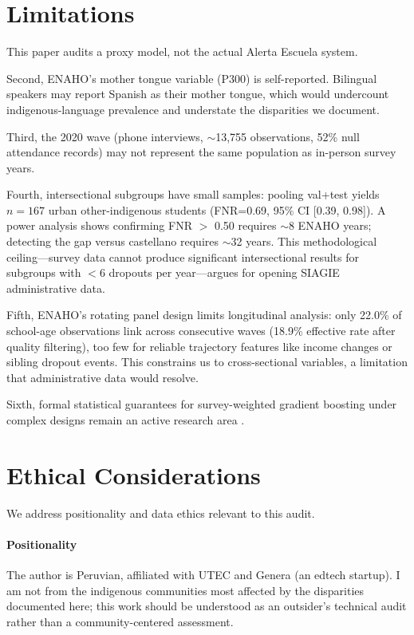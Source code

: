 \documentclass[notitlepage,12pt]{jedm}
\begin{document}
\section{Limitations}

This paper audits a proxy model, not the actual Alerta Escuela system.

Second, ENAHO's mother tongue variable (P300) is self-reported. Bilingual speakers may report Spanish as their mother tongue, which would undercount indigenous-language prevalence and understate the disparities we document.

Third, the 2020 wave (phone interviews, $\sim$13,755 observations, 52\% null attendance records) may not represent the same population as in-person survey years.

Fourth, intersectional subgroups have small samples: pooling val+test yields $n=167$ urban other-indigenous students (FNR=0.69, 95\% CI [0.39, 0.98]). A power analysis shows confirming FNR $>$ 0.50 requires $\sim$8 ENAHO years; detecting the gap versus castellano requires $\sim$32 years. This methodological ceiling---survey data cannot produce significant intersectional results for subgroups with $<$6 dropouts per year---argues for opening SIAGIE administrative data.

Fifth, ENAHO's rotating panel design limits longitudinal analysis: only 22.0\% of school-age observations link across consecutive waves (18.9\% effective rate after quality filtering), too few for reliable trajectory features like income changes or sibling dropout events. This constrains us to cross-sectional variables, a limitation that administrative data would resolve.

Sixth, formal statistical guarantees for survey-weighted gradient boosting under complex designs remain an active research area \cite{macnell2023implementing}.

\section{Ethical Considerations}

We address positionality and data ethics relevant to this audit.

\paragraph{Positionality} The author is Peruvian, affiliated with UTEC and Genera (an edtech startup). I am not from the indigenous communities most affected by the disparities documented here; this work should be understood as an outsider's technical audit rather than a community-centered assessment.
\end{document}
